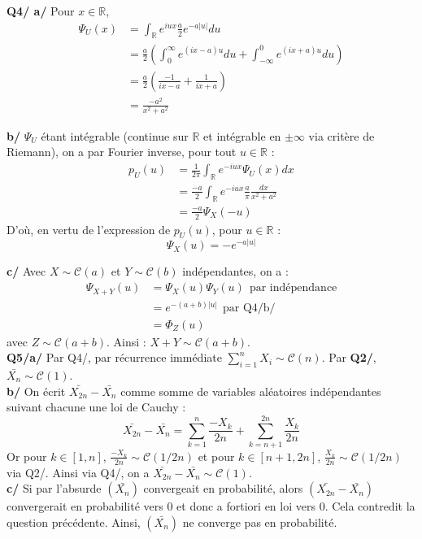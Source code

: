 \documentclass[a4paper,12pt]{article}
\begin{document}
\textbf{Q4/ a/} Pour $x \in \mathbb{R}$, 
\begin{align*}
\Psi_U(x) &= \int_{\mathbb{R}} e^{iux} \frac{a}{2} e^{-a|u|} du \\
&= \frac{a}{2} \left( \int_{0}^{\infty} e^{(ix-a)u} du + \int_{-\infty}^{0} e^{(ix+a)u} du \right) \\
&= \frac{a}{2} \left( \frac{-1}{ix-a} + \frac{1}{ix+a} \right) \\
&\boxed{= \frac{-a^2}{x^2+a^2}}
\end{align*}

\textbf{b/} $\Psi_U$ étant intégrable (continue sur $\mathbb{R}$ et intégrable en $\pm \infty$ via critère de Riemann), on a par Fourier inverse, pour tout $u \in \mathbb{R}$ :
\begin{align*}
p_U(u) &= \frac{1}{2\pi} \int_{\mathbb{R}} e^{-iux} \Psi_U(x) dx \\
&= \frac{-a}{2} \int_{\mathbb{R}} e^{-iux} \frac{a}{\pi} \frac{dx}{x^2+a^2} \\
&= \frac{-a}{2} \Psi_X (-u) 
\end{align*}
D'où, en vertu de l'expression de $p_U(u)$, pour $u \in \mathbb{R}$ : 
$$\boxed{\Psi_X(u)=-e^{-a|u|}}$$

\textbf{c/} Avec $X \sim \mathcal{C}(a)$ et $Y \sim \mathcal{C} (b)$ indépendantes, on a :
\begin{align*}
\Psi_{X+Y}(u) &= \Psi_X(u) \Psi_Y(u) \ \ \text{par indépendance} \\
&= e^{-(a+b)|u|} \ \ \text{par Q4/b/} \\
&= \Phi_Z(u)
\end{align*}
avec $Z \sim \mathcal{C} (a+b)$.
Ainsi : $\boxed{X+Y \sim \mathcal{C} (a+b)}$. \\

\textbf{Q5/a/} Par Q4/, par récurrence immédiate $\sum_{i=1}^n X_i \sim \mathcal{C} (n)$. Par \textbf{Q2/}, $\boxed{\bar{X_n} \sim \mathcal{C}(1)}$. \\

\textbf{b/} On écrit $\bar{X_{2n}} - \bar{X_n}$ comme somme de variables aléatoires indépendantes suivant chacune une loi de Cauchy :
$$\bar{X_{2n}} - \bar{X_n} = \sum_{k=1}^n \frac{-X_k}{2n} + \sum_{k=n+1}^{2n} \frac{X_k}{2n}$$
Or pour $k\in [1,n]$, $\frac{-X_k}{2n} \sim \mathcal{C} (1/2n)$ et pour $k \in [n+1, 2n]$, $\frac{X_k}{2n} \sim \mathcal{C} (1/2n)$ via Q2/. Ainsi via Q4/, on a $\boxed{\bar{X_{2n}} - \bar{X_n} \sim \mathcal{C} (1)}$. \\

\textbf{c/} Si par l'absurde $(\bar{X_n})$ convergeait en probabilité, alors $(\bar{X_{2n}} - \bar{X_n})$ convergerait en probabilité vers $0$ et donc a fortiori en loi vers $0$. Cela contredit la question précédente. Ainsi, $(\bar{X_n})$ ne converge pas en probabilité. \\
\end{document}
